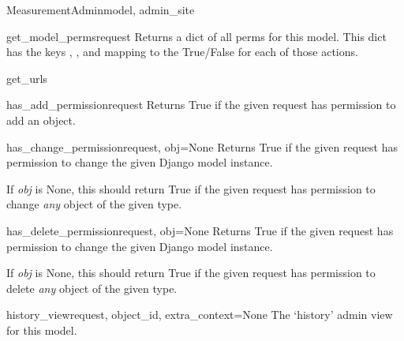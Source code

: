 \documentclass[letterpaper,10pt,english]{sphinxmanual}
\begin{document}
\begin{classdesc}{MeasurementAdmin}{model, admin\_site}
\hypertarget{data.admin.MeasurementAdmin.get_model_perms}{}\begin{methoddesc}{get\_model\_perms}{request}
Returns a dict of all perms for this model. This dict has the keys
, , and  mapping to the True/False for each
of those actions.
\end{methoddesc}

\hypertarget{data.admin.MeasurementAdmin.get_urls}{}\begin{methoddesc}{get\_urls}{}\end{methoddesc}

\hypertarget{data.admin.MeasurementAdmin.has_add_permission}{}\begin{methoddesc}{has\_add\_permission}{request}
Returns True if the given request has permission to add an object.
\end{methoddesc}

\hypertarget{data.admin.MeasurementAdmin.has_change_permission}{}\begin{methoddesc}{has\_change\_permission}{request, obj=None}
Returns True if the given request has permission to change the given
Django model instance.

If \emph{obj} is None, this should return True if the given request has
permission to change \emph{any} object of the given type.
\end{methoddesc}

\hypertarget{data.admin.MeasurementAdmin.has_delete_permission}{}\begin{methoddesc}{has\_delete\_permission}{request, obj=None}
Returns True if the given request has permission to change the given
Django model instance.

If \emph{obj} is None, this should return True if the given request has
permission to delete \emph{any} object of the given type.
\end{methoddesc}

\hypertarget{data.admin.MeasurementAdmin.history_view}{}\begin{methoddesc}{history\_view}{request, object\_id, extra\_context=None}
The `history' admin view for this model.
\end{methoddesc}


\end{classdesc}
\end{document}

